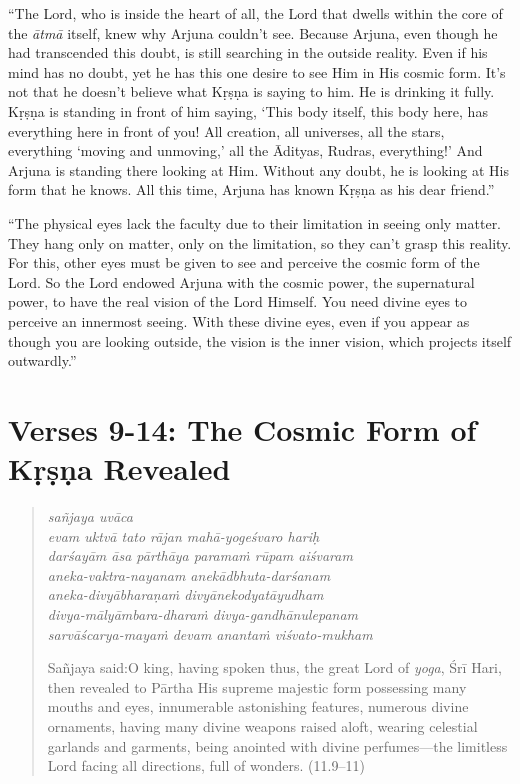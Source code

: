 \documentclass[12pt, twoside, openright]{memoir}
\begin{document}
\enquote{The Lord, who is inside the heart of all, the Lord that dwells within the core of the \textit{ātmā} itself, knew why Arjuna couldn’t see. Because Arjuna, even though he had transcended this doubt, is still searching in the outside reality. Even if his mind has no doubt, yet he has this one desire to see Him in His cosmic form. It’s not that he doesn’t believe what Kṛṣṇa is saying to him. He is drinking it fully. Kṛṣṇa is standing in front of him saying, \enquote{This body itself, this body here, has everything here in front of you! All creation, all universes, all the stars, everything ‘moving and unmoving,’ all the Ādityas, Rudras, everything!} And Arjuna is standing there looking at Him. Without any doubt, he is looking at His form that he knows. All this time, Arjuna has known Kṛṣṇa as his dear friend.}

\enquote{The physical eyes lack the faculty due to their limitation in seeing only matter. They hang only on matter, only on the limitation, so they can’t grasp this reality. For this, other eyes must be given to see and perceive the cosmic form of the Lord. So the Lord endowed Arjuna with the cosmic power, the supernatural power, to have the real vision of the Lord Himself. You need divine eyes to perceive an innermost seeing. With these divine eyes, even if you appear as though you are looking outside, the vision is the inner vision, which projects itself outwardly.}

\newpage
\section{Verses 9-14: The Cosmic Form of Kṛṣṇa Revealed}\label{sec-verses-9-14-the-cosmic-form-of-krsna-revealed}


\par
\begin{verse}
\textit{sañjaya uvāca} \\
\textit{evam uktvā tato rājan mahā-yogeśvaro hariḥ} \\
\textit{darśayām āsa pārthāya paramaṁ rūpam aiśvaram} \\
\textit{aneka-vaktra-nayanam anekādbhuta-darśanam} \\
\textit{aneka-divyābharaṇaṁ divyānekodyatāyudham} \\
\textit{divya-mālyāmbara-dharaṁ divya-gandhānulepanam} \\
\textit{sarvāścarya-mayaṁ devam anantaṁ viśvato-mukham}

\noindent \quad Sañjaya said:\linebreak O king, having spoken thus, the great Lord of \textit{yoga}, Śrī Hari, then revealed to Pārtha His supreme majestic form possessing many mouths and eyes, innumerable astonishing features, numerous divine ornaments, having many divine weapons raised aloft, wearing celestial garlands and garments, being anointed with divine perfumes---the limitless Lord facing all directions, full of wonders. (11.9–11)
\end{verse}
\par
\end{document}
